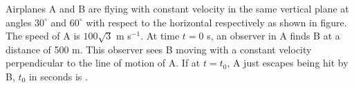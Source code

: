

    \item Airplanes A and B are flying with constant velocity in the same vertical plane at angles \(30^\circ\) and \(60^\circ\) with respect to the horizontal respectively as shown in figure. The speed of A is \(100\sqrt{3}\) m s\(^{-1}\). At time \(t = 0\) s, an observer in A finds B at a distance of 500 m. This observer sees B moving with a constant velocity perpendicular to the line of motion of A. If at \(t = t_0\), A just escapes being hit by B, \(t_0\) in seconds is \underline{\hspace{2.5 cm}}.

    \begin{center}
    \end{center}

